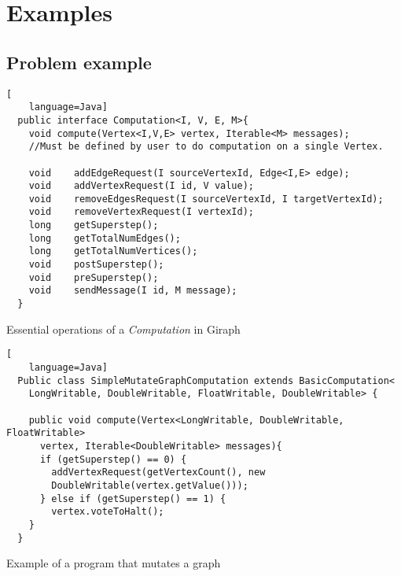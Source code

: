 \section{Examples}
\subsection{Problem example}
\begin{frame}[fragile]
\begin{lstlisting}[
    language=Java]
  public interface Computation<I, V, E, M>{
    void compute(Vertex<I,V,E> vertex, Iterable<M> messages);
    //Must be defined by user to do computation on a single Vertex.
	
    void 	addEdgeRequest(I sourceVertexId, Edge<I,E> edge);
    void 	addVertexRequest(I id, V value);
    void 	removeEdgesRequest(I sourceVertexId, I targetVertexId);
    void 	removeVertexRequest(I vertexId);
    long 	getSuperstep();
    long 	getTotalNumEdges();
    long 	getTotalNumVertices();
    void 	postSuperstep();
    void 	preSuperstep();
    void 	sendMessage(I id, M message);
  }
\end{lstlisting}
Essential operations of a \textit{Computation} in Giraph
\end{frame}

\begin{frame}[fragile]
\begin{lstlisting}[
    language=Java]
  Public class SimpleMutateGraphComputation extends BasicComputation<
    LongWritable, DoubleWritable, FloatWritable, DoubleWritable> {

    public void compute(Vertex<LongWritable, DoubleWritable, FloatWritable>
      vertex, Iterable<DoubleWritable> messages){ 
      if (getSuperstep() == 0) {
      	addVertexRequest(getVertexCount(), new
      	DoubleWritable(vertex.getValue()));
      } else if (getSuperstep() == 1) {
        vertex.voteToHalt();
    } 
  }
\end{lstlisting}
Example of a program that mutates a graph
\end{frame}

